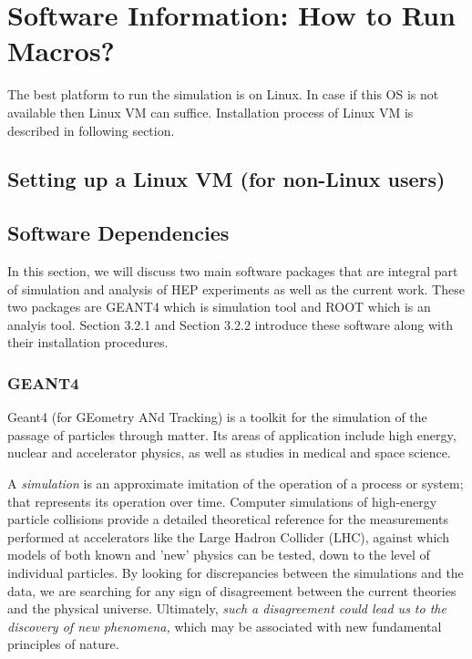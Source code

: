 \chapter{Software Information: How to Run Macros?}
The best platform to run the simulation is on Linux. In case if this OS is not available then Linux VM can suffice. Installation process of Linux VM is described in following section.
\section{Setting up a Linux VM (for non-Linux users)}       %





\section{Software Dependencies}
In this section, we will discuss two main software packages that are integral part of simulation and analysis of HEP experiments as well as the current work. These two packages are GEANT4 which is simulation tool and ROOT which is an analyis tool. Section 3.2.1 and Section 3.2.2 introduce these software along with their installation procedures.

\subsection{GEANT4}
Geant4 (for GEometry ANd Tracking) is a toolkit for the simulation of the passage of particles through matter. Its areas of application include high energy, nuclear and accelerator physics, as well as studies in medical and space science.

A \textit{simulation} is an approximate imitation of the operation of a process or system; that represents its operation over time. Computer simulations of high-energy particle collisions provide a detailed theoretical reference for the measurements performed at accelerators like the Large Hadron Collider (LHC), against which models of both known and 'new' physics can be tested, down to the level of individual particles. By looking for discrepancies between the simulations and the data, we are searching for any sign of disagreement between the current theories and the physical universe. Ultimately, \textit{such a disagreement could lead us to the discovery of new phenomena,} which may be associated with new fundamental principles of nature.
 
